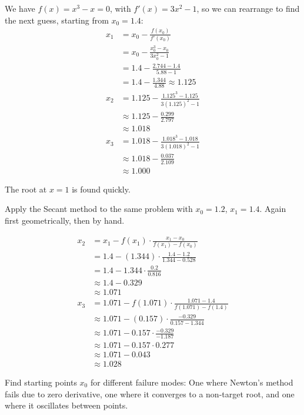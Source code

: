 We have $f(x) = x^3 - x = 0$, with  $f'(x) = 3x^2 - 1$, so we can rearrange to find the next guess,
starting from $x_0 = 1.4$:
\begin{align*}
    x_1 &= x_0 - \frac{f(x_0)}{f'(x_0)} \\
    &= x_0 - \frac{x_0^3 - x_0}{3x_0^2 - 1} \\
    &= 1.4 - \frac{2.744 - 1.4}{5.88 - 1} \\
    &= 1.4 - \frac{1.344}{4.88} \approx 1.125 \\
    x_2 &= 1.125 - \frac{1.125^3 - 1.125}{3(1.125)^2 - 1} \\
    &\approx 1.125 - \frac{0.299}{2.797} \\
    &\approx 1.018 \\
    x_3 &= 1.018 - \frac{1.018^3 - 1.018}{3(1.018)^2 - 1} \\
    &\approx 1.018 - \frac{0.037}{2.109} \\
    &\approx 1.000
\end{align*}

The root at $x = 1$ is found quickly.


 Apply the Secant method to the same problem with $x_0 = 1.2$, $x_1 = 1.4$.
Again first geometrically, then by hand.

\begin{align*}
    x_2 &= x_1 - f(x_1) \cdot \frac{x_1 - x_0}{f(x_1) - f(x_0)} \\
    &= 1.4 - (1.344) \cdot \frac{1.4-1.2}{1.344 - 0.528} \\
    &= 1.4 - 1.344 \cdot \frac{0.2}{0.816} \\
    &\approx 1.4 - 0.329 \\
    &\approx 1.071 \\
    x_3 &= 1.071 - f(1.071) \cdot \frac{1.071 - 1.4}{f(1.071) - f(1.4)} \\
     &\approx 1.071 - (0.157) \cdot \frac{-0.329}{0.157 - 1.344} \\
     &\approx 1.071 - 0.157 \cdot \frac{-0.329}{-1.187} \\
     &\approx 1.071 - 0.157 \cdot 0.277 \\
     &\approx 1.071 - 0.043 \\
     &\approx 1.028
\end{align*}


\vspace{2em}
Find starting points $x_0$ for different failure modes: One where Newton's method fails due to zero derivative, 
one where it converges to a non-target root, and one where it oscillates between points.



